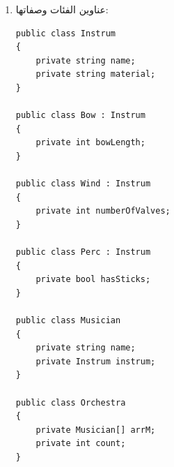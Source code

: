 \begin{boxSolution}
\begin{enumerate}[label=\textbf{(\arabic*)}, start=2]
    \item عناوين الفئات وصفاتها:
\begin{boxCode}
\begin{english}
\begin{verbatim}
public class Instrum
{
    private string name;
    private string material;
}

public class Bow : Instrum
{
    private int bowLength;
}

public class Wind : Instrum
{
    private int numberOfValves;
}

public class Perc : Instrum
{
    private bool hasSticks;
}

public class Musician
{
    private string name;
    private Instrum instrum;
}

public class Orchestra
{
    private Musician[] arrM;
    private int count;
}
\end{verbatim}
\end{english}
\end{boxCode}
\end{enumerate}
\end{boxSolution}

\filbreak

